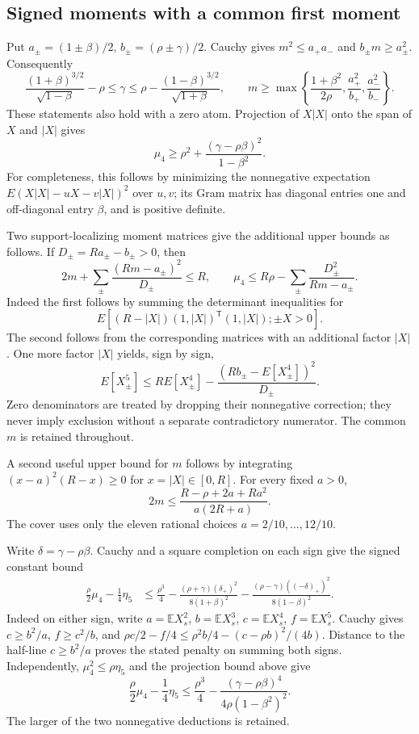 \documentclass[11pt,a4paper]{article}
\numberwithin{equation}{section}
\theoremstyle{definition}
\theoremstyle{remark}
\newcommand{\E}{\mathbb E}
\begin{document}
\subsection{Signed moments with a common first moment}
Put $a_\pm=(1\pm\beta)/2$, $b_\pm=(\rho\pm\gamma)/2$.
Cauchy gives $m^2\le a_+a_-$ and $b_\pm m\ge a_\pm^2$.
Consequently
\[
 \frac{(1+\beta)^{3/2}}{\sqrt{1-\beta}}-\rho
 \le\gamma\le
 \rho-\frac{(1-\beta)^{3/2}}{\sqrt{1+\beta}},\qquad
 m\ge\max\left\{\frac{1+\beta^2}{2\rho},
                  \frac{a_+^2}{b_+},\frac{a_-^2}{b_-}\right\}.
\]
These statements also hold with a zero atom. Projection of $X|X|$ onto
the span of $X$ and $|X|$ gives
\[
 \mu_4\ge\rho^2+\frac{(\gamma-\rho\beta)^2}{1-\beta^2}.
\]
For completeness, this follows by minimizing the nonnegative expectation
$E(X|X|-uX-v|X|)^2$ over $u,v$; its Gram matrix has diagonal entries
one and off-diagonal entry $\beta$, and is positive definite.

Two support-localizing moment matrices give the additional upper bounds
as follows. If
$D_\pm=Ra_\pm-b_\pm>0$, then
\[
 2m+\sum_\pm\frac{(Rm-a_\pm)^2}{D_\pm}\le R,
 \qquad
 \mu_4\le R\rho-\sum_\pm\frac{D_\pm^2}{Rm-a_\pm}.
\]
Indeed the first follows by summing the determinant inequalities for
\[E[(R-|X|)(1,|X|)^{\mathsf T}(1,|X|);\pm X>0].\]
The second follows from the corresponding matrices with an additional
factor $|X|$. One more factor $|X|$ yields, sign by sign,
\[
 E[X_\pm^5]\le R E[X_\pm^4]
 -\frac{(Rb_\pm-E[X_\pm^4])^2}{D_\pm}.
\]
Zero denominators are treated by dropping their nonnegative correction;
they never imply exclusion without a separate contradictory numerator.
The common $m$ is retained throughout.

A second useful upper bound for $m$ follows by integrating
$(x-a)^2(R-x)\ge0$ for $x=|X|\in[0,R]$. For every fixed $a>0$,
\[
 2m\le\frac{R-\rho+2a+Ra^2}{a(2R+a)}.
\]
The cover uses only the eleven rational choices $a=2/10,\ldots,12/10$.

Write $\delta=\gamma-\rho\beta$. Cauchy and a square completion on
each sign give the signed constant bound
\begin{align*}
 \frac\rho2\mu_4-\frac14\eta_5
 &\le\frac{\rho^3}{4}
 -\frac{(\rho+\gamma)(\delta_+)^2}{8(1+\beta)^2}
 -\frac{(\rho-\gamma)((-\delta)_+)^2}{8(1-\beta)^2}.
\end{align*}
Indeed on either sign, write $a=\E X_s^2$, $b=\E X_s^3$,
$c=\E X_s^4$, $f=\E X_s^5$. Cauchy gives $c\ge b^2/a$,
$f\ge c^2/b$, and
$\rho c/2-f/4\le\rho^2b/4-(c-\rho b)^2/(4b)$.
Distance to the half-line $c\ge b^2/a$ proves the stated penalty
on summing both signs. Independently,
$\mu_4^2\le\rho\eta_5$ and the projection bound above give
\[
 \frac\rho2\mu_4-\frac14\eta_5
 \le\frac{\rho^3}{4}
 -\frac{(\gamma-\rho\beta)^4}{4\rho(1-\beta^2)^2}.
\]
The larger of the two nonnegative deductions is retained.
\end{document}
